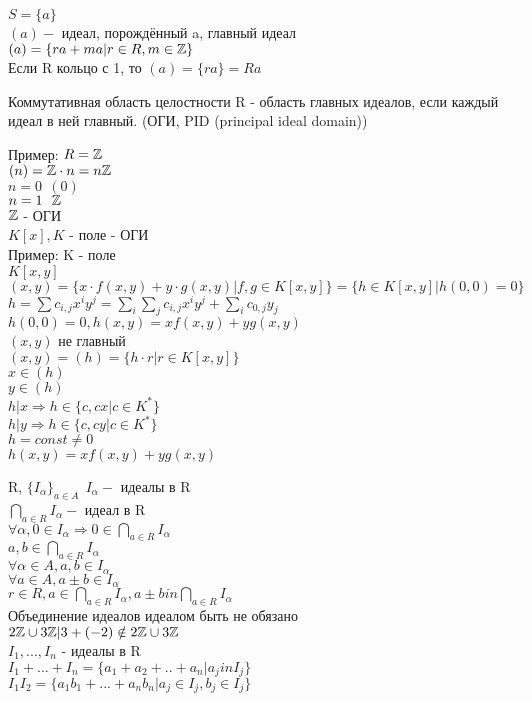 $ S = \{a\} $\\
$ (a) - $ идеал, порождённый a, главный идеал\\
$ (a) = \{ ra + ma | r \in R, m \in \mathbb{Z} \} $\\
Если R кольцо с 1, то $ (a) = \{ra\} = Ra $\\
\begin{definition}
	Коммутативная область целостности R - область главных идеалов, если каждый идеал в ней главный. (ОГИ, PID (principal ideal domain))  
\end{definition}
Пример: $ R = \mathbb{Z} $ \\
$ (n) = \mathbb{Z} \cdot n = n\mathbb{Z} $\\
$ n = 0 \ \ (0) $\\
$ n = 1 \ \ \mathbb{Z} $ \\
$ \mathbb{Z} $ - ОГИ \\
$ K[x], K $ - поле - ОГИ \\
Пример: K - поле \\
$ K[x, y] $ \\
$ (x, y) = \{x\cdot f(x, y) + y\cdot g(x, y)  | f, g \in K[x, y] \}  = \{ h \in K[x, y] | h(0, 0) = 0 \}$ \\
$ h = \sum c_{i,j} x^iy^j = \sum_i \sum_j c_{i, j} x^i y^j + \sum_i c_{0, j} y_j $ \\
$ h(0, 0) = 0, h(x, y) = xf(x, y) + yg(x , y) $\\
$ (x, y) $ не главный \\
$ (x, y) = (h) = \{ h \cdot r | r \in K[x, y] \} $\\
$ x \in (h) $\\
$ y \in (h) $ \\
$ h | x \Rightarrow h \in \{ c, cx | c \in K^* \} $\\
$ h | y \Rightarrow h \in \{ c, cy | c \in K^* \} $ \\
$ h = const \neq 0 $\\
$ h(x, y) = xf(x, y) + yg(x, y) $\\

R, $ \{ I_{\alpha} \}_{a \in A} \ \ I_{\alpha} -  $ идеалы в R \\
$ \bigcap_{a \in R} I_{\alpha} - $ идеал в R \\
$ \forall \alpha, 0 \in I_{\alpha} \Rightarrow 0 \in  \bigcap_{a \in R} I_{\alpha} $\\
$ a, b \in  \bigcap_{a \in R} I_{\alpha} $ \\
$ \forall \alpha \in A, a, b \in I_{\alpha} $\\
$ \forall a \in A, a \pm b \in I_{\alpha} $\\
$ r \in R, a \in  \bigcap_{a \in R} I_{\alpha} , a\pm b in  \bigcap_{a \in R} I_{\alpha} $\\
Объединение идеалов идеалом быть не обязано \\
$ 2 \mathbb{Z} \cup 3\mathbb{Z} | 3 + (-2) \notin  2 \mathbb{Z} \cup 3\mathbb{Z}$ \\
$ I_1, ..., I_n $ - идеалы в R \\
$ I_1 + ... + I_n = \{ a_1 + a_2 + .. + a_n | a_j in I_j \}$ \\
$ I_1 I_2 = \{a_1b_1 + ... + a_nb_n | a_j \in I_j, b_j \in I_j \} $\\

